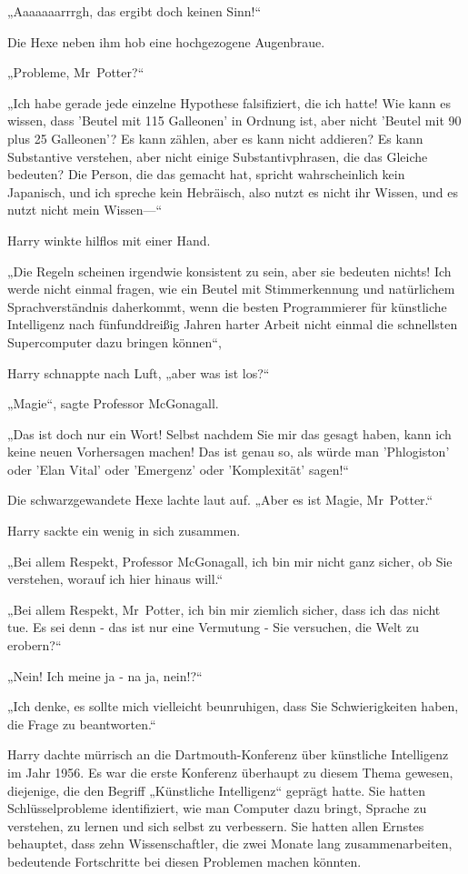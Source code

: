 {„Aaaaaaarrrgh, das ergibt doch keinen Sinn!“

Die Hexe neben ihm hob eine hochgezogene Augenbraue.

„Probleme, Mr~Potter?“

„Ich habe gerade jede einzelne Hypothese falsifiziert, die ich hatte! Wie kann es wissen, dass 'Beutel mit 115 Galleonen' in Ordnung ist, aber nicht 'Beutel mit 90 plus 25 Galleonen'? Es kann zählen, aber es kann nicht addieren? Es kann Substantive verstehen, aber nicht einige Substantivphrasen, die das Gleiche bedeuten? Die Person, die das gemacht hat, spricht wahrscheinlich kein Japanisch, und ich spreche kein Hebräisch, also nutzt es nicht ihr Wissen, und es nutzt nicht mein Wissen—“

Harry winkte hilflos mit einer Hand.

„Die Regeln scheinen irgendwie konsistent zu sein, aber sie bedeuten nichts! Ich werde nicht einmal fragen, wie ein Beutel mit Stimmerkennung und natürlichem Sprachverständnis daherkommt, wenn die besten Programmierer für künstliche Intelligenz nach fünfunddreißig Jahren harter Arbeit nicht einmal die schnellsten Supercomputer dazu bringen können“,

Harry schnappte nach Luft, „aber was ist los?“

„Magie“, sagte Professor McGonagall.

„Das ist doch nur ein Wort! Selbst nachdem Sie mir das gesagt haben, kann ich keine neuen Vorhersagen machen! Das ist genau so, als würde man 'Phlogiston' oder 'Elan Vital' oder 'Emergenz' oder 'Komplexität' sagen!“

Die schwarzgewandete Hexe lachte laut auf. „Aber es ist Magie, Mr~Potter.“

Harry sackte ein wenig in sich zusammen.

„Bei allem Respekt, Professor McGonagall, ich bin mir nicht ganz sicher, ob Sie verstehen, worauf ich hier hinaus will.“

„Bei allem Respekt, Mr~Potter, ich bin mir ziemlich sicher, dass ich das nicht tue. Es sei denn - das ist nur eine Vermutung - Sie versuchen, die Welt zu erobern?“

„Nein! Ich meine ja - na ja, nein!?“

„Ich denke, es sollte mich vielleicht beunruhigen, dass Sie Schwierigkeiten haben, die Frage zu beantworten.“

Harry dachte mürrisch an die Dartmouth-Konferenz über künstliche Intelligenz im Jahr 1956. Es war die erste Konferenz überhaupt zu diesem Thema gewesen, diejenige, die den Begriff „Künstliche Intelligenz“ geprägt hatte. Sie hatten Schlüsselprobleme identifiziert, wie man Computer dazu bringt, Sprache zu verstehen, zu lernen und sich selbst zu verbessern. Sie hatten allen Ernstes behauptet, dass zehn Wissenschaftler, die zwei Monate lang zusammenarbeiten, bedeutende Fortschritte bei diesen Problemen machen könnten.

}
